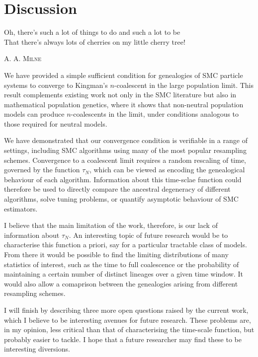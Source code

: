 \chapter{Discussion}

\epigraph{
Oh, there's such a lot of things to do and such a lot to be\\
That there's always lots of cherries on my little cherry tree!
}
{\textsc{A. A. Milne}}

We have provided a simple sufficient condition for genealogies of SMC particle systems to converge to Kingman's $n$-coalescent in the large population limit. 
This result complements existing work not only in the SMC literature but also in mathematical population genetics, where it shows that non-neutral population models can produce $n$-coalescents in the limit, under conditions analogous to those required for neutral models.

We have demonstrated that our convergence condition is verifiable in a range of settings, including SMC algorithms using many of the most popular resampling schemes. 
Convergence to a coalescent limit requires a random rescaling of time, governed by the function $\tau_N$, which can be viewed as encoding the genealogical behaviour of each algorithm.
Information about this time-sclae function could therefore be used to directly compare the ancestral degeneracy of different algorithms, solve tuning problems, or quantify asymptotic behaviour of SMC estimators.

I believe that the main limitation of the work, therefore, is our lack of information about $\tau_N$. An interesting topic of future research would be to characterise this function a priori, say for a particular tractable class of models.
From there it would be possible to find the limiting distributions of many statistics of interest, such as the time to full coalescence or the probability of maintaining a certain number of distinct lineages over a given time window. It would also allow a comaprison between the genealogies arising from different resampling schemes.

I will finish by describing three more open questions raised by the current work, which I believe to be interesting avenues for future research. These problems are, in my opinion, less critical than that of characterising the time-scale function, but probably easier to tackle. 
I hope that a future researcher may find these to be interesting diversions.

